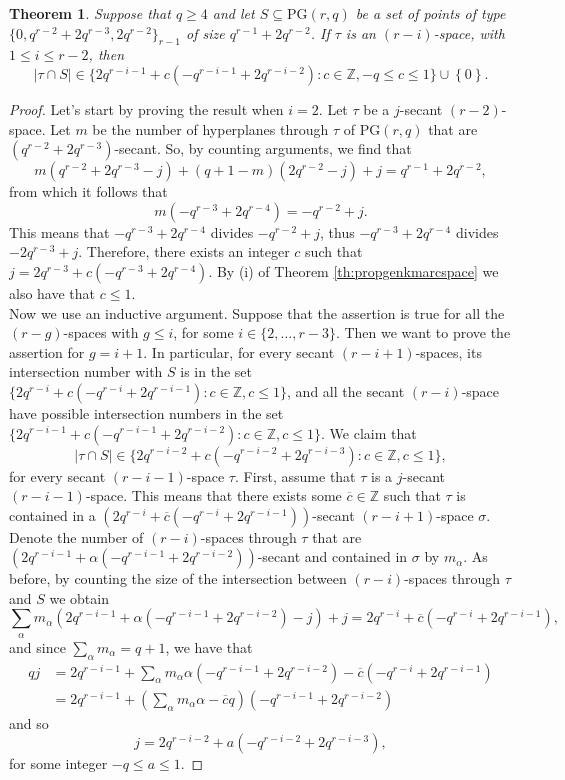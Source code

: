 \documentclass[11pt]{amsart}
\newtheorem{theorem}{Theorem}[section]
\newcommand{\PG}{\mathrm{PG}}
\newcommand{\set}[1]{ \left \{ #1 \right \} }
\begin{document}
\begin{theorem} 
\label{th:intersectionspaces}
Suppose that $q\geq 4$ and let $S \subseteq \PG(r,q)$ be a set of points of type $\{0,q^{r-2}+2q^{r-3},2q^{r-2}\}_{r-1}$ of size $q^{r-1}+2q^{r-2}$.
If $\tau$ is an $(r-i)$-space, with $1 \leq i \leq r-2$, then
\[
 |\tau \cap S| \in \{2q^{r-i-1}+c(-q^{r-i-1}+2q^{r-i-2}) \colon c \in \mathbb{Z}, -q \leq c \leq 1\} \cup \set 0.
\]
\end{theorem}
\begin{proof}
Let's start by proving the result when $i=2$. Let $\tau$ be a $j$-secant $(r-2)$-space. Let $m$ be the number of hyperplanes through $\tau$ of $\PG(r,q)$ that are $(q^{r-2}+2q^{r-3})$-secant. So, by counting arguments, we find that
\[
m(q^{r-2}+2q^{r-3}-j)+(q+1-m)(2q^{r-2}-j)+j=q^{r-1}+2q^{r-2},
\]
from which it follows that
\[
m(-q^{r-3}+2q^{r-4})=-q^{r-2}+j.
\]
This means that $-q^{r-3}+2q^{r-4}$ divides $-q^{r-2}+j$, thus $-q^{r-3}+2q^{r-4}$ divides $-2q^{r-3}+j$. Therefore, there exists an integer $c$ such that $j=2q^{r-3}+c(-q^{r-3}+2q^{r-4})$. By (i) of Theorem \ref{th:propgenkmarcspace} we also have 
that $c \leq 1$.\\
Now we use an inductive argument.
Suppose that the assertion is true for all the $(r-g)$-spaces with $g\leq i$, for some $i \in \{2,\ldots,r-3\}$. 
Then we want to prove the assertion for $g=i+1$.
In particular, for every secant $(r-i+1)$-spaces, its intersection number with $S$ is in the set
 $\{2q^{r-i}+c(-q^{r-i}+2q^{r-i-1}) \colon c \in \mathbb{Z}, c \leq 1\}$, and all the secant $(r-i)$-space have possible intersection numbers in the set $\{2q^{r-i-1}+c(-q^{r-i-1}+2q^{r-i-2}) \colon c \in \mathbb{Z}, c \leq 1\} $.
We claim that 
\[
 |\tau \cap S| \in \{2q^{r-i-2}+c(-q^{r-i-2}+2q^{r-i-3}) \colon c \in \mathbb{Z}, c \leq 1\}, 
\]
for every secant $(r-i-1)$-space $\tau$. First, assume that $\tau$ is a $j$-secant $(r-i-1)$-space. This means that there exists some $\overline{c} \in \mathbb{Z}$ such that $\tau$ is contained in a $(2q^{r-i}+\overline{c}(-q^{r-i}+2q^{r-i-1}))$-secant $(r-i+1)$-space $\sigma$. 
Denote the number of $(r-i)$-spaces through $\tau$ that are $(2q^{r-i-1}+\alpha(-q^{r-i-1}+2q^{r-i-2}))$-secant and contained in $\sigma$ by $m_\alpha$. As before, by counting the size of the intersection between $(r-i)$-spaces through $\tau$ and $S$ we obtain
 \[
 \sum_{\alpha} m_{\alpha} (2q^{r-i-1}+{\alpha}(-q^{r-i-1}+2q^{r-i-2})-j)+j=2q^{r-i}+\overline{c}(-q^{r-i}+2q^{r-i-1}), 
 \]
and since $\sum_{\alpha} m_{\alpha}=q+1$, we have that
\[
\begin{array}{rl}
qj & = 2q^{r-i-1}+\sum_{\alpha} m_{\alpha} {\alpha}(-q^{r-i-1}+2q^{r-i-2})-\overline{c}(-q^{r-i}+2q^{r-i-1}) \\
& = 2q^{r-i-1}+(\sum_{\alpha} m_{\alpha} {\alpha}-\overline{c}q)(-q^{r-i-1}+2q^{r-i-2})
\end{array}\] 
and so
\[
j=2q^{r-i-2}+a(-q^{r-i-2}+2q^{r-i-3}),
\]
for some integer $-q\leq a \leq 1$. 
\end{proof}
\end{document}
